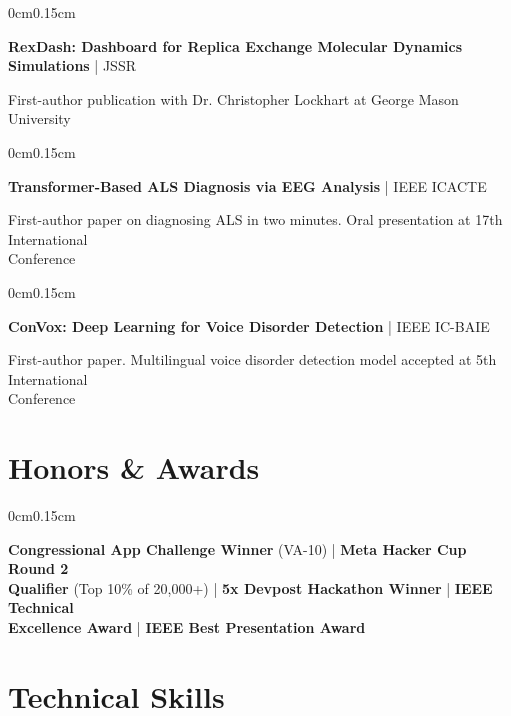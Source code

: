\documentclass[10pt, letterpaper]{article}
\newenvironment{onecolentry}{
    \begin{adjustwidth}{0cm}{0.15cm}
}{
    \end{adjustwidth}
}
\begin{document}
    \vspace{0.1cm}

    \begin{onecolentry}
        \textbf{RexDash: Dashboard for Replica Exchange Molecular Dynamics Simulations} | JSSR
        
        \vspace{0.05cm}
        First-author publication with Dr. Christopher Lockhart at George Mason University
    \end{onecolentry}

    \vspace{0.1cm}

    \begin{onecolentry}
        \textbf{Transformer-Based ALS Diagnosis via EEG Analysis} | IEEE ICACTE
        
        \vspace{0.05cm}
        First-author paper on diagnosing ALS in two minutes. Oral presentation at 17th International\\Conference
    \end{onecolentry}

    \vspace{0.1cm}

    \begin{onecolentry}
        \textbf{ConVox: Deep Learning for Voice Disorder Detection} | IEEE IC-BAIE
        
        \vspace{0.05cm}
        First-author paper. Multilingual voice disorder detection model accepted at 5th International\\Conference
    \end{onecolentry}

    \section{Honors \& Awards}
    \vspace{0.05cm}

    \begin{onecolentry}
        \textbf{Congressional App Challenge Winner} (VA-10) | \textbf{Meta Hacker Cup Round 2\\Qualifier} (Top 10\% of 20,000+) | \textbf{5x Devpost Hackathon Winner} | \textbf{IEEE Technical\\Excellence Award} | \textbf{IEEE Best Presentation Award}
    \end{onecolentry}

    \section{Technical Skills}
    \vspace{0.05cm}
\end{document}
